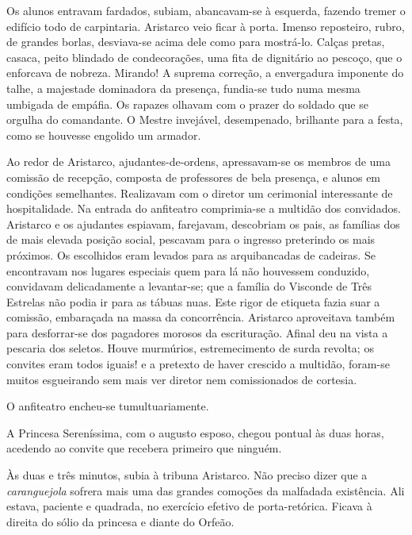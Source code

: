 Os alunos entravam fardados, subiam, abancavam{}-se à
esquerda, fazendo tremer o edifício todo de carpintaria. Aristarco veio
ficar à porta. Imenso reposteiro, rubro, de grandes borlas,
desviava{}-se acima dele como para mostrá{}-lo. Calças pretas, casaca,
peito blindado de condecorações, uma fita de dignitário ao pescoço, que
o enforcava de nobreza. Mirando! A suprema correção, a envergadura
imponente do talhe, a majestade dominadora da presença, fundia{}-se
tudo numa mesma umbigada de empáfia. Os rapazes olhavam com o prazer do
soldado que se orgulha do comandante. O Mestre invejável, desempenado,
brilhante para a festa, como se houvesse engolido um armador. 

Ao redor de Aristarco, ajudantes{}-de{}-ordens, apressavam{}-se os membros de
uma comissão de recepção, composta de professores de bela presença, e
alunos em condições semelhantes. Realizavam com o diretor um cerimonial
interessante de hospitalidade. Na entrada do anfiteatro comprimia{}-se
a multidão dos convidados. Aristarco e os ajudantes espiavam,
farejavam, descobriam os pais, as famílias dos de mais elevada posição
social, pescavam para o ingresso preterindo os mais próximos. Os
escolhidos eram levados para as arquibancadas de cadeiras. Se
encontravam nos lugares especiais quem para lá não houvessem conduzido,
convidavam delicadamente a levantar{}-se; que a família do Visconde de
Três Estrelas não podia ir para as tábuas nuas. Este rigor de etiqueta
fazia suar a comissão, embaraçada na massa da concorrência. Aristarco
aproveitava também para desforrar{}-se dos pagadores morosos da
escrituração. Afinal deu na vista a pescaria dos seletos. Houve
murmúrios, estremecimento de surda revolta; os convites eram todos
iguais! e a pretexto de haver crescido a multidão, foram{}-se muitos
esgueirando sem mais ver diretor nem comissionados de
cortesia. 

O anfiteatro encheu{}-se tumultuariamente. 

A Princesa Sereníssima, com o augusto esposo, chegou pontual às duas horas,
acedendo ao convite que recebera primeiro que ninguém. 

Às duas e três
minutos, subia à tribuna Aristarco. Não preciso dizer que a
\textit{caranguejola} sofrera mais uma das grandes comoções da malfadada
existência. Ali estava, paciente e quadrada, no exercício efetivo de
porta{}-retórica. Ficava à direita do sólio da princesa e diante do Orfeão. 

